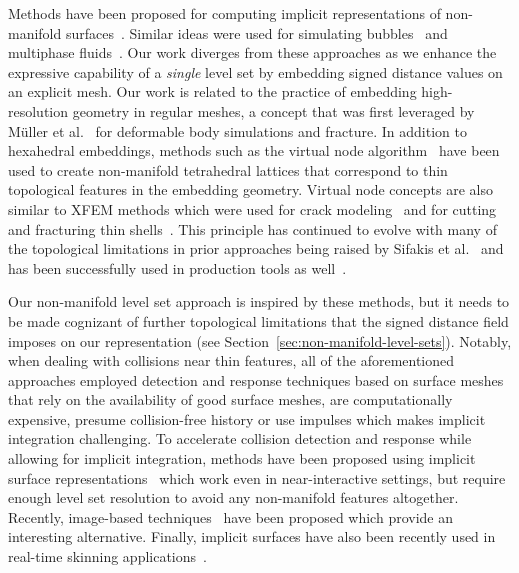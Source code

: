 \documentclass[12pt,oneside,letterpaper]{memoir}
\begin{document}
Methods have been proposed for computing implicit representations of
non-manifold surfaces~\cite{BloomF:1995,YuanYW:2012}. Similar ideas
were used for simulating bubbles~\cite{ZhengYP:2006} and multiphase
fluids~\cite{LosasSSF:2006}. Our work diverges from these approaches
as we enhance the expressive capability of a \emph{single} level set
by embedding signed distance values on an explicit mesh. Our work is
related to the practice of embedding high-resolution geometry in
regular meshes, a concept that was first leveraged by M\"{u}ller et
al.~ for deformable body simulations and
fracture.  In addition to hexahedral embeddings, methods such as the
virtual node algorithm~\cite{MolinBF:2004} have been used to create
non-manifold tetrahedral lattices that correspond to thin topological
features in the embedding geometry. Virtual node concepts are also
similar to XFEM methods which were used for crack
modeling~\cite{MoeesDB:1999} and for cutting and fracturing thin
shells~\cite{KaufmMBGG:2009}. This principle has continued to evolve
with many of the topological limitations in prior approaches being
raised by Sifakis et al.~ and has been
successfully used in production tools as well~\cite{HellrSSST:2009}.

Our non-manifold level set approach is inspired by these methods, but
it needs to be made cognizant of further topological limitations that
the signed distance field imposes on our representation (see
Section~\ref{sec:non-manifold-level-sets}). Notably, when dealing with
collisions near thin features, all of the aforementioned approaches
employed detection and response techniques based on surface
meshes~\cite{BridsFA:2002} that rely on the availability of good
surface meshes, are computationally expensive, presume collision-free
history or use impulses which makes implicit integration
challenging. To accelerate collision detection and response while
allowing for implicit integration, methods have been proposed using
implicit surface representations~\cite{McAdaZSETTS:2011} which work
even in near-interactive settings, but require enough level set
resolution to avoid any non-manifold features altogether. Recently,
image-based techniques~\cite{FaureBAF:2008,WangFP:2012} have been
proposed which provide an interesting alternative.  Finally, implicit
surfaces have also been recently used in real-time skinning
applications~\cite{VaillBGCRWGP:2013,VaillGBWC:2014}.





\end{document}
